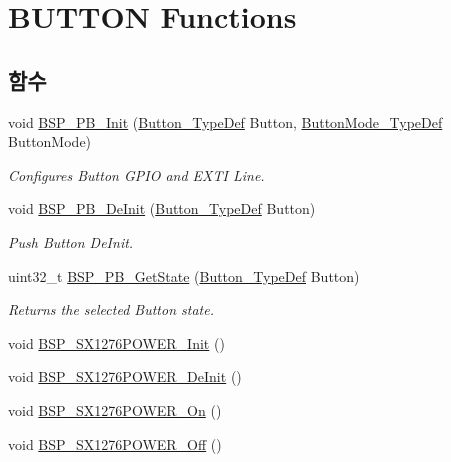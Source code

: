 \hypertarget{group___s_t_m32_l1_x_x___n_u_c_l_e_o___b_u_t_t_o_n___functions}{}\section{B\+U\+T\+T\+ON Functions}
\label{group___s_t_m32_l1_x_x___n_u_c_l_e_o___b_u_t_t_o_n___functions}
\subsection*{함수}
\begin{DoxyCompactItemize}
\item 
void \mbox{\hyperlink{group___s_t_m32_l1_x_x___n_u_c_l_e_o___b_u_t_t_o_n___functions_gad31c8db50a71c1f6dbfe132d72ba0bc6}{B\+S\+P\+\_\+\+P\+B\+\_\+\+Init}} (\mbox{\hyperlink{_lory_s_d_k__hw__conf_8h_a643816dfbad5c734fc25a29ce8d35bb1}{Button\+\_\+\+Type\+Def}} Button, \mbox{\hyperlink{_lory_s_d_k__hw__conf_8h_a48825b7c7d851c440ef8e808fd9d8f0a}{Button\+Mode\+\_\+\+Type\+Def}} Button\+Mode)
\begin{DoxyCompactList}\small\item\em Configures Button G\+P\+IO and E\+X\+TI Line. \end{DoxyCompactList}\item 
void \mbox{\hyperlink{group___s_t_m32_l1_x_x___n_u_c_l_e_o___b_u_t_t_o_n___functions_gac1bd746e7f6037d50ca3784ebe05686e}{B\+S\+P\+\_\+\+P\+B\+\_\+\+De\+Init}} (\mbox{\hyperlink{_lory_s_d_k__hw__conf_8h_a643816dfbad5c734fc25a29ce8d35bb1}{Button\+\_\+\+Type\+Def}} Button)
\begin{DoxyCompactList}\small\item\em Push Button De\+Init. \end{DoxyCompactList}\item 
uint32\+\_\+t \mbox{\hyperlink{group___s_t_m32_l1_x_x___n_u_c_l_e_o___b_u_t_t_o_n___functions_ga8f0978b6cffda9c67266ddfdb3a0abf7}{B\+S\+P\+\_\+\+P\+B\+\_\+\+Get\+State}} (\mbox{\hyperlink{_lory_s_d_k__hw__conf_8h_a643816dfbad5c734fc25a29ce8d35bb1}{Button\+\_\+\+Type\+Def}} Button)
\begin{DoxyCompactList}\small\item\em Returns the selected Button state. \end{DoxyCompactList}\item 
void \mbox{\hyperlink{group___s_t_m32_l1_x_x___n_u_c_l_e_o___b_u_t_t_o_n___functions_ga46ccfec03200a24f3737fc8015e2d5f7}{B\+S\+P\+\_\+\+S\+X1276\+P\+O\+W\+E\+R\+\_\+\+Init}} ()
\item 
void \mbox{\hyperlink{group___s_t_m32_l1_x_x___n_u_c_l_e_o___b_u_t_t_o_n___functions_ga42c7cbbf0254f5f11135797d083bcb2c}{B\+S\+P\+\_\+\+S\+X1276\+P\+O\+W\+E\+R\+\_\+\+De\+Init}} ()
\item 
void \mbox{\hyperlink{group___s_t_m32_l1_x_x___n_u_c_l_e_o___b_u_t_t_o_n___functions_gaef6814f684bbf7fa47adda1abc4c1129}{B\+S\+P\+\_\+\+S\+X1276\+P\+O\+W\+E\+R\+\_\+\+On}} ()
\item 
void \mbox{\hyperlink{group___s_t_m32_l1_x_x___n_u_c_l_e_o___b_u_t_t_o_n___functions_ga0514aa0607414fb41ea7e37a58ce6307}{B\+S\+P\+\_\+\+S\+X1276\+P\+O\+W\+E\+R\+\_\+\+Off}} ()
\end{DoxyCompactItemize}


